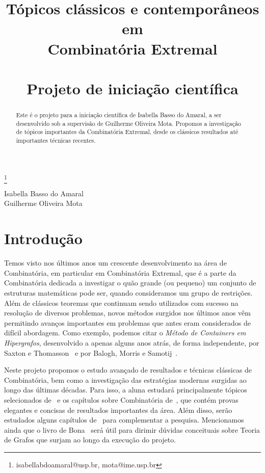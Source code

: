 \documentclass[12pt,reqno]{amsart}
\theoremstyle{note}
\begin{document}
\title[]{Tópicos clássicos e contemporâneos em\\ Combinatória Extremal\\
\ \\ Projeto de iniciação científica}

 \thanks{isabellabdoamaral@usp.br, mota@ime.usp.br}
%   
\maketitle
\thispagestyle{empty}


 Isabella Basso do Amaral\\
 Guilherme Oliveira Mota


{
\begin{abstract}
Este é o projeto para a iniciação científica de Isabella Basso do
Amaral, a ser desenvolvido sob a supervisão de Guilherme Oliveira
Mota.
Propomos a investigação de tópicos importantes da Combinatória
Extremal, desde os clássicos resultados até importantes técnicas recentes.
\end{abstract}


\section{Introdução}

Temos visto nos últimos anos um crescente desenvolvimento na área de
Combinatória, em particular em Combinatória Extremal, que é a parte da
Combinatória dedicada a investigar o quão grande (ou pequeno) um
conjunto de estruturas matemáticas pode ser, quando consideramos um
grupo de restrições.
Além de clássicos teoremas que continuam sendo utilizados com sucesso
na resolução de diversos problemas, novos métodos surgidos nos últimos
anos vêm permitindo avanços importantes em problemas que antes eram
considerados de difícil abordagem.
Como exemplo, podemos citar o \emph{Método de Containers em
  Hipergrafos}, desenvolvido a apenas alguns anos atrás, de forma
independente, por Saxton e Thomasson~\cite{SaTh15} e por Balogh,
Morris e Samotij~\cite{BaMoSa15}. 


Neste projeto propomos o estudo avançado de resultados e técnicas
clássicas de Combinatória, bem como a investigação das estratégias
modernas surgidas ao longo das últimas décadas.
Para isso, a aluna estudará principalmente tópicos selecionados
de~\cite{Ju11} e os capítulos sobre Combinatória
de~\cite{AiZi14}, que contém provas elegantes e concisas de
resultados importantes da área.
Além disso, serão estudados alguns capítulos de~\cite{Di18} para
complementar a pesquisa.
Mencionamos ainda que o livro de Bona~\cite{Bo17} será útil para
dirimir dúvidas conceituais sobre Teoria de Grafos que surjam ao longo
da execução do projeto.

}
\end{document}
